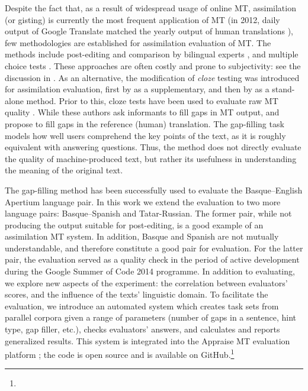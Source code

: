\documentclass[11pt]{article}
\newcommand{\comment}[1]{\marginpar{\scriptsize\sf \textcolor{blue}{#1}}}
\begin{document}
Despite the fact that, as a result of widespread usage of online MT, assimilation (or gisting) is currently the most frequent application of MT (in 2012, daily output of Google Translate matched the yearly output of human translations \citep{google}), few methodologies are established for assimilation evaluation of MT. The methods include post-editing and comparison by bilingual experts \citep{ginesti09},\comment{MLF: should we also cite the original WMT reference cited by Ginestí et al.?} and multiple choice tests \citep{jones07,trosterud12}. These approaches are often costly and prone to subjectivity: see the discussion in \cite{oregan13}. As an alternative, the modification of \emph{cloze}\comment{\emph{cloze} stands for \emph{closure}.} testing \citep{taylor53} was introduced for assimilation evaluation, first by \citet{trosterud12} as a supplementary, and then by \citet{oregan13} as a stand-alone method. Prior to this, cloze tests have been used to evaluate raw MT quality \citep{vanslype79,somers00}. While these authors ask informants to fill gaps in MT output, \citet{trosterud12} and \citet{oregan13} propose to fill gaps in the reference (human) translation. The gap-filling task models how well users comprehend the key points of the text, as it is roughly equivalent with answering questions. Thus, the method does not directly evaluate the quality of machine-produced text, but rather its usefulness in understanding the meaning of the original text. 

The gap-filling method has been successfully used to evaluate the Basque--English Apertium language pair. In this work we extend the evaluation to two more language pairs: Basque--Spanish and Tatar-Russian. The former pair, while not producing the output suitable for post-editing, is a good example of an assimilation MT system. In addition, Basque and Spanish are not mutually understandable, and therefore constitute a good pair for evaluation. For the latter pair, the evaluation served as a quality check in the period of active development during the Google Summer of Code 2014 programme. In addition to evaluating, we explore new aspects of the experiment: the correlation between evaluators' scores, and the influence of the texts' linguistic domain. To facilitate the evaluation, we introduce an automated system which creates task sets from parallel corpora given a range of parameters (number of gaps in a sentence, hint type, gap filler,\comment{MLF: gap filler or gap marker?} \comment{EA: well, initially we had questions with lemmas in place of gaps, and also multiple choice questions where answer options got generated automatically. This is not used in this evaluation, but it's still in the toolkit. Should I remove?} etc.), checks evaluators' answers, and calculates and reports generalized results. This system is integrated into the Appraise MT evaluation platform \citep{federmann12}; the code is open source and is available on GitHub.\footnote{}
\end{document}
